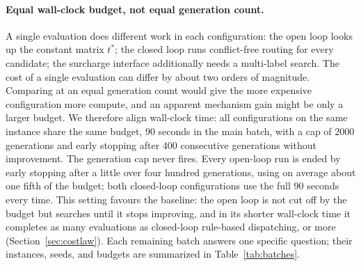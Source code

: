 \documentclass[manuscript,screen,review]{acmart}
\begin{document}
\paragraph{Equal wall-clock budget, not equal generation count.}
A single evaluation does different work in each configuration: the open loop looks up the constant matrix $t^{*}$; the closed loop runs conflict-free routing for every candidate; the surcharge interface additionally needs a multi-label search.
The cost of a single evaluation can differ by about two orders of magnitude. Comparing at an equal generation count would give the more expensive configuration more compute, and an apparent mechanism gain might be only a larger budget.
We therefore align wall-clock time: all configurations on the same instance share the same budget, $90$ seconds in the main batch, with a cap of $2000$ generations and early stopping after $400$ consecutive generations without improvement.
The generation cap never fires. Every open-loop run is ended by early stopping after a little over four hundred generations, using on average about one fifth of the budget; both closed-loop configurations use the full $90$ seconds every time.
This setting favours the baseline: the open loop is not cut off by the budget but searches until it stops improving, and in its shorter wall-clock time it completes as many evaluations as closed-loop rule-based dispatching, or more (Section~\ref{sec:costlaw}).
Each remaining batch answers one specific question; their instances, seeds, and budgets are summarized in Table~\ref{tab:batches}.
\end{document}
